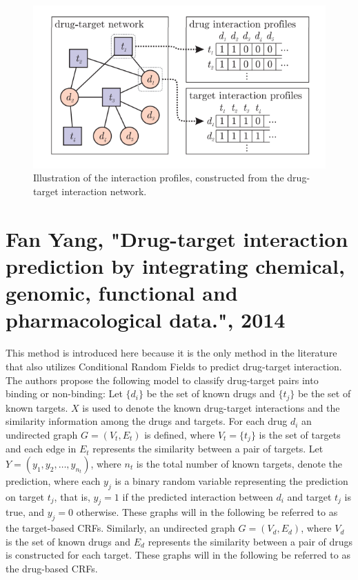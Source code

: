 \begin{figure}
\begin{center}
\includegraphics[scale=0.65]{laarhoven_related.png}
\end{center}
\caption[Illustration of Gaussian Interaction Profile Kernel Method]{\large{Illustration of the interaction profiles, constructed from the drug-target interaction network.}}
\label{fig:laarhoven_1}
\end{figure}

\section{Fan Yang, "Drug-target interaction prediction by integrating chemical, genomic, functional and pharmacological data.", 2014}

This method is introduced here because it is the only method in the literature that also utilizes Conditional Random Fields to predict drug-target interaction. The authors propose the following model to classify drug-target pairs into binding or non-binding: Let $\{d_i\}$ be the set of known drugs and $\{t_j\}$ be the set of known targets. $X$ is used to denote the known drug-target interactions and the similarity information among the drugs and targets. For each drug $d_i$ an undirected graph $G=(V_t, E_t)$ is defined, where $V_t=\{t_j\}$ is the set of targets and each edge in $E_t$ represents the similarity between a pair of targets. Let $Y=(y_1, y_2, \dots, y_{n_t})$, where $n_t$ is the total number of known targets, denote the prediction, where each $y_j$ is a binary random variable representing the prediction on target $t_j$, that is, $y_j=1$ if the predicted interaction between $d_i$ and target $t_j$ is true, and $y_j=0$ otherwise. These graphs will in the following be referred to as the target-based CRFs. Similarly, an undirected graph $G=(V_d, E_d)$, where $V_d$ is the set of known drugs and $E_d$ represents the similarity between a pair of drugs is constructed for each target. These graphs will in the following be referred to as the drug-based CRFs. 

